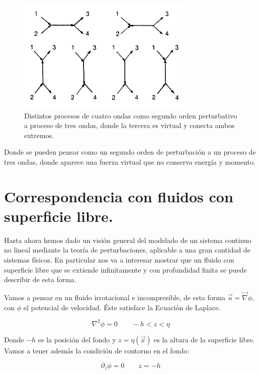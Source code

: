 \begin{figure}[!ht]
	\centering
	\includegraphics[width=0.7\linewidth]{Figures/Antecedentes_teoricos/Procesos_de_4_ondas}
	\caption{Distintos procesos de cuatro ondas como segundo orden perturbativo a proceso de tres ondas, donde la tercera es virtual y conecta ambos extremos. } %
	\label{fig:procesosde4ondas}
\end{figure}


Donde se pueden pensar como un segundo orden de perturbación a un proceso de tres ondas, donde aparece una fuerza virtual que no conserva energía y momento. 



\section{Correspondencia con fluidos con superficie libre.}
Hasta ahora hemos dado un visión general del modelado de un sistema continuo no lineal mediante la teoría de perturbaciones, aplicable a una gran cantidad de sistemas físicos. En particular nos va a interesar mostrar que un fluido con superficie libre que se extiende infinitamente y con profundidad finita se puede describir de esta forma.

Vamos a pensar en un fluido irrotacional e incompresible, de esta forma $\vec u = \vec \nabla \phi$, con $\phi$ el potencial de velocidad. Éste satisface la Ecuación de Laplace.

\begin{equation}
	\nabla^2\phi = 0 \qquad -h<z<\eta
\end{equation}

Donde $-h$ es la posición del fondo y $z=\eta(\vec x)$ es la altura de la superficie libre. Vamos a tener además la condición de contorno en el fondo:

\begin{equation}
	\partial_z\phi=0 \qquad z=-h
\end{equation}

